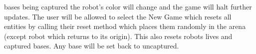bases being captured the robot’s color will change and the game will halt further updates. The user will be allowed to select the New Game which resets all entities by calling their reset method which places them randomly in the arena (except robot which returns to its origin). This also resets robots lives and captured bases. Any base will be set back to uncaptured. 